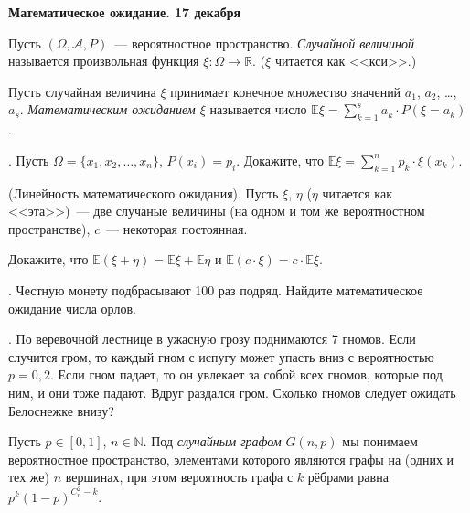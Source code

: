 \centerline{\bf Математическое ожидание. 17 декабря}

\begin{definition}
Пусть $(\Omega,\mathcal{A},P)$~--- вероятностное пространство.
{\it Случайной величиной} называется произвольная функция $\xi\colon \Omega\to\mathbb{R}$.
($\xi$ читается как <<кси>>.)
\end{definition}

\begin{definition}
Пусть случайная величина $\xi$ принимает конечное множество значений $a_1$, $a_2$, \ldots, $a_s$.
{\it Математическим ожиданием $\xi$} называется число $\mathbb{E}\xi=\sum\limits_{k=1}^s a_k\cdot P(\xi=a_k)$.
\end{definition}

. Пусть $\Omega=\{x_1,x_2,\ldots, x_n\}$, $P(x_i)=p_i$. Докажите, что
$\mathbb{E}\xi=\sum\limits_{k=1}^n p_k\cdot \xi(x_k)$.

 (Линейность математического ожидания).
Пусть $\xi$, $\eta$ ($\eta$ читается как <<эта>>)~--- две случаные величины 
(на одном и том же вероятностном пространстве), $c$~--- некоторая постоянная. 

Докажите, что $\mathbb{E}(\xi+\eta)=\mathbb{E}\xi+\mathbb{E}\eta$ и
$\mathbb{E}(c\cdot \xi)=c\cdot \mathbb{E}\xi$.

\medskip

. Честную монету подбрасывают 100 раз подряд. Найдите математическое ожидание числа орлов.

. По веревочной лестнице в ужасную грозу поднимаются 7 гномов. Если случится гром, то каждый 
гном с испугу может упасть вниз с вероятностью $p=0{,}2$. Если гном падает, то он увлекает за собой 
всех гномов, которые под ним, и они тоже падают. Вдруг раздался гром. Сколько гномов следует ожидать Белоснежке внизу? 

% 

\begin{definition}
Пусть $p\in[0,1]$, $n\in \mathbb{N}$. Под {\it случайным графом} $G(n,p)$ мы понимаем вероятностное пространство, элементами
которого являются графы на (одних и тех же) $n$ вершинах, при этом вероятность графа с $k$ рёбрами равна $p^k(1-p)^{C_n^2-k}$.
\end{definition}


